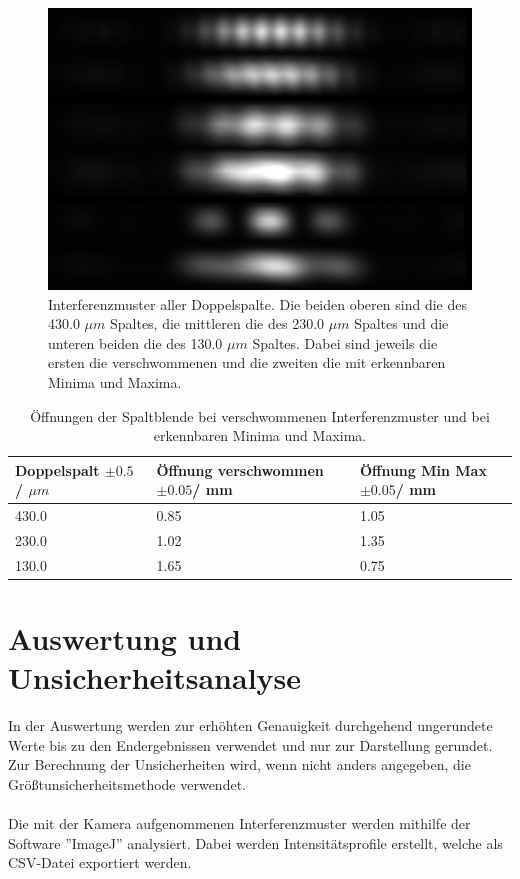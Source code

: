 \documentclass[12pt,a4paper,twoside]{article}
\begin{document}
\begin{figure}[H]
    \centering
    \includegraphics[width=0.6\linewidth]{nudes/aufgabe 4.jpg}
    \caption{Interferenzmuster aller Doppelspalte. Die beiden oberen sind die des 430.0 $\mu m$ Spaltes, die mittleren die des 230.0 $\mu m$ Spaltes und die unteren beiden die des 130.0 $\mu m$ Spaltes. 
    Dabei sind jeweils die ersten die verschwommenen und die zweiten die mit erkennbaren Minima und Maxima. }
    \label{fig:aufgabe 4}
\end{figure}

\begin{table}[H]
    \centering
    \caption{Öffnungen der  Spaltblende bei verschwommenen Interferenzmuster und bei erkennbaren Minima und Maxima. }
    \label{tab:öffnungen}
    \begin{tabular}{| l | l | l |}
        \hline
        Doppelspalt $\pm 0.5$ / $\mu m $ & Öffnung verschwommen $\pm 0.05$/ mm & Öffnung Min Max $\pm 0.05$/ mm\\
        \hline
        430.0 & 0.85 & 1.05 \\
        230.0 & 1.02 & 1.35 \\
        130.0 & 1.65 & 0.75 \\
        \hline
    \end{tabular}
\end{table}

\section{Auswertung und Unsicherheitsanalyse} %

In der Auswertung werden zur erhöhten Genauigkeit durchgehend ungerundete Werte bis zu den Endergebnissen verwendet und nur zur Darstellung gerundet. \\
Zur Berechnung der Unsicherheiten wird, wenn nicht anders angegeben, die Größtunsicherheitsmethode verwendet.
\\
\\
Die mit der Kamera aufgenommenen Interferenzmuster werden mithilfe der Software ''ImageJ'' analysiert. 
Dabei werden Intensitätsprofile erstellt, welche als CSV-Datei exportiert werden. 
\end{document}
